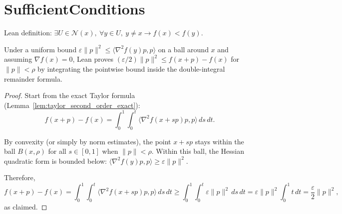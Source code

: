 
\chapter{SufficientConditions}\label{sec:SufficientConditions}

\begin{definition}\label{def:IsStrictLocalMin}
  \leanok{}
  \uses{}
  Lean definition:
  $\exists U\in \mathcal{N}(x),\ \forall y\in U,\ y\neq x \to f(x)<f(y)$.
\end{definition}

\begin{lemma}\label{lem:taylor_lower_bound_from_hessian_lb}
  \leanok{}
  Under a uniform bound $\varepsilon\|p\|^2 \le \langle \nabla^2 f(y)p,p\rangle$ on a ball around $x$
  and assuming $\nabla f(x)=0$, Lean proves
  $(\varepsilon/2)\|p\|^2 \le f(x+p)-f(x)$ for $\|p\|<\rho$ by integrating the pointwise bound inside the
  double-integral remainder formula.
\end{lemma}

\begin{proof}
  \leanok{}
  Start from the exact Taylor formula (Lemma~\ref{lem:taylor_second_order_exact}):
  \[
    f(x+p)-f(x)=\int_0^1\int_0^t \langle \nabla^2 f(x+s p)p,p\rangle\,ds\,dt.
  \]

  By convexity (or simply by norm estimates), the point $x+ sp$ stays within the ball $B(x,\rho)$ for all $s \in [0,1]$ when $\|p\| < \rho$.
  Within this ball, the Hessian quadratic form is bounded below: $\langle \nabla^2 f(y)p,p\rangle \ge \varepsilon\|p\|^2$.

  Therefore,
  \[
    f(x+p)-f(x) = \int_0^1\int_0^t \langle \nabla^2 f(x+s p)p,p\rangle\,ds\,dt
    \ge \int_0^1\int_0^t \varepsilon\|p\|^2\,ds\,dt
    = \varepsilon\|p\|^2 \int_0^1 t\,dt = \frac{\varepsilon}{2}\|p\|^2,
  \]
  as claimed.
\end{proof}

